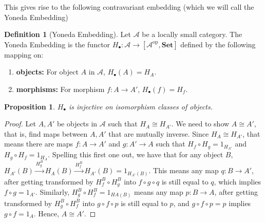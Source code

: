 \documentclass[11pt]{article}
\theoremstyle{definition}
\newtheorem*{defn}{Definition}
\theoremstyle{definition}
\theoremstyle{plain}
\theoremstyle{plain}
\newtheorem{prop}{Proposition}
\theoremstyle{plain}
\begin{document}
This gives rise to the following contravariant embedding (which we will call the Yoneda Embedding)

\begin{defn}[Yoneda Embedding]
Let $\mathscr{A}$ be a locally small category. The Yoneda Embedding is the functor $H_{\bullet}:\mathscr{A} \to [\mathscr{A}^{\text{op}},\textbf{Set}]$ defined by the following mapping on:

\begin{enumerate}
\item \textbf{objects: } For object $A$ in $\mathscr{A}$, $H_{\bullet}(A) = H_A$.
\item \textbf{morphisms: } For morphism $f: A \to A'$, $H_{\bullet}(f) = H_f$.
\end{enumerate}
\end{defn}

\begin{prop}
$H_{\bullet}$ is injective on isomorphism classes of objects.
\end{prop}

\begin{proof}
Let $A,A'$ be objects in $\mathscr{A}$ such that $H_A \cong H_{A'}$. We need to show $A \cong A'$, that is, find maps between $A, A'$ that are mutually inverse. Since $H_A \cong H_{A'}$, that means there are maps $f: A \to A'$ and $g: A' \to A$ such that $H_f \circ H_g = 1_{H_{A'}}$ and $H_g \circ H_f = 1_{H_{A}}$. Spelling this first one out, we have that for any object $B$, $H_{A'}(B) \overset{H_g^B}{\longrightarrow} H_A(B) \overset{H_f^B}{\longrightarrow} H_{A'}(B) = 1_{H_{A'}(B)}$. This means any map $q: B \to A'$, after getting transformed by $H_f^B \circ H_g^B$ into $f \circ g \circ q$ is still equal to $q$, which implies $f \circ g = 1_{A'}$. Similarly, $H_g^B \circ H_f^B = 1_{H{A}(B)}$ means any map $p: B \to A$, after getting transformed by $H_g^B \circ H_f^B$ into $g \circ f \circ p$ is still equal to $p$, and $g \circ f \circ p = p$ implies $g \circ f = 1_{A}$. Hence, $A \cong A'$.
\end{proof}

\nocite{*}


\end{document}
